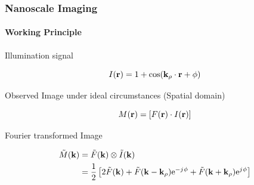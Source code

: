 \documentclass[mathserif,16pt,xcolor=table]{beamer}
\begin{document}
      \begin{frame}
        \frametitle{Nanoscale Imaging}
        \framesubtitle{Working Principle}
        \begin{outline}[itemize]
          \1 Illumination signal
        \end{outline}
        \begin{equation} \nonumber
          I(\mathbf{r}) = 1 + \cos(\mathbf{k}_{\rho} \cdot \mathbf{r} + \phi)
          \label{eq:intensity}
        \end{equation} \vspace*{-.5cm}
        \begin{outline}[itemize]
          \1 Observed Image under ideal circumstances (Spatial domain)
        \end{outline}
        \begin{equation} \nonumber
          M(\mathbf{r}) = \left[ F(\mathbf{r}) \cdot I(\mathbf{r}) \right]
          \label{eq:m_spatial_image}
        \end{equation} \vspace*{-.5cm}
        \begin{outline}[itemize]
          \1 Fourier transformed Image
        \end{outline}
        \begin{equation} \nonumber
          \begin{split}
            \tilde{M}(\mathbf{k}) &= \tilde{F}(\mathbf{k}) \otimes \tilde{I}(\mathbf{k}) \\
            &= \frac{1}{2} \left[ 2\tilde{F}(\mathbf{k}) + \tilde{F}(\mathbf{k} - \mathbf{k}_{\rho}) \mathrm{e}^{- {j}\mkern1mu \phi} + \tilde{F}(\mathbf{k} + \mathbf{k}_{\rho}) \mathrm{e}^{{j}\mkern1mu \phi} \right]
          \end{split}
          \label{eq:m_ft}
        \end{equation}
      \end{frame}
\end{document}
